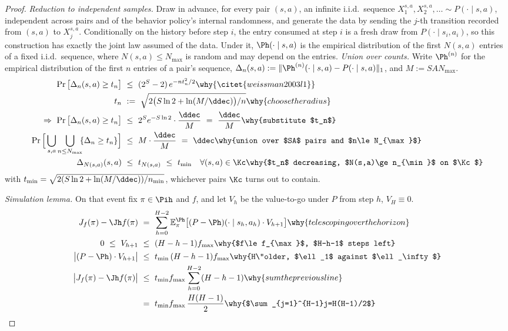 \begin{proof}
\emph{Reduction to independent samples.} Draw in advance, for every pair
$(s,a)$, an infinite i.i.d.\ sequence
$X^{s,a}_1,X^{s,a}_2,\dots\sim P(\cdot\mid s,a)$, independent across pairs
and of the behavior policy's internal randomness, and generate the data by
sending the $j$-th transition recorded from $(s,a)$ to $X^{s,a}_j$.
Conditionally on the history before step $i$, the entry consumed at step
$i$ is a fresh draw from $P(\cdot\mid s_i,a_i)$, so this construction has
exactly the joint law assumed of the data. Under it,
$\Ph(\cdot\mid s,a)$ is the empirical distribution of the first $N(s,a)$
entries of a fixed i.i.d.\ sequence, where $N(s,a)\le N_{\max}$ is random and
may depend on the entries.
\emph{Union over counts.} Write $\Ph^{(n)}$ for the empirical distribution
of the first $n$ entries of a pair's sequence,
$\Delta_n(s,a):=\|\Ph^{(n)}(\cdot\mid s,a)-P(\cdot\mid s,a)\|_1$, and
$M:=SAN_{\max}$.
\begin{align*}
\Pr\big[\Delta_n(s,a)\ge t_n\big]\ &\le\ (2^S-2)\,e^{-nt_n^2/2}
   \why{\citet{weissman2003l1}}\\
t_n\ &:=\ \sqrt{2\big(S\ln2+\ln(M/\ddec)\big)/n}
   \why{choose the radius}\\
\Rightarrow\ \Pr\big[\Delta_n(s,a)\ge t_n\big]\ &\le\ 2^S e^{-S\ln2}\cdot\frac{\ddec}{M}\ =\ \frac{\ddec}{M}
   \why{substitute $t_n$}\\
\Pr\Big[\bigcup_{s,a}\bigcup_{n\le N_{\max}}\!\!\{\Delta_n\ge t_n\}\Big]\
   &\le\ M\cdot\frac{\ddec}{M}\ =\ \ddec
   \why{union over $SA$ pairs and $n\le N_{\max}$}\\
\Delta_{N(s,a)}(s,a)\ &\le\ t_{N(s,a)}\ \le\ t_{\min}\quad\forall(s,a)\in\Kc
   \why{$t_n$ decreasing, $N(s,a)\ge n_{\min}$ on $\Kc$}
\end{align*}
with $t_{\min}=\sqrt{2(S\ln2+\ln(M/\ddec))/n_{\min}}$, whichever pairs $\Kc$
turns out to contain.

\emph{Simulation lemma.} On that event fix $\pi\in\Pih$ and $f$, and let
$V_h$ be the value-to-go under $P$ from step $h$, $V_H\equiv0$.
\begin{align*}
J_f(\pi)-\Jh f(\pi)\ &=\ \sum_{h=0}^{H-2}\mathbb E^{\Ph}_\pi\big[(P-\Ph)(\cdot\mid s_h,a_h)\cdot V_{h+1}\big]
   \why{telescoping over the horizon}\\
0\ \le\ V_{h+1}\ &\le\ (H-h-1)f_{\max} \why{$f\le f_{\max}$, $H-h-1$ steps left}\\
\big|(P-\Ph)\cdot V_{h+1}\big|\ &\le\ t_{\min}\,(H-h-1)f_{\max}
   \why{H\"older, $\ell_1$ against $\ell_\infty$}\\
\big|J_f(\pi)-\Jh f(\pi)\big|\ &\le\ t_{\min}f_{\max}\sum_{h=0}^{H-2}(H-h-1)
   \why{sum the previous line}\\
   &=\ t_{\min}f_{\max}\,\frac{H(H-1)}{2}
   \why{$\sum_{j=1}^{H-1}j=H(H-1)/2$}
\end{align*}
\end{proof}

